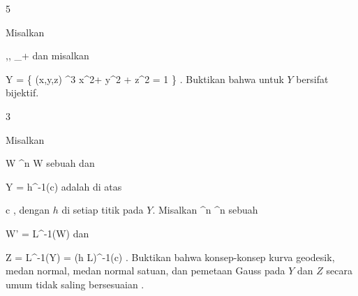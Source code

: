{5}
{

Misalkan

\mavergleichskette
{\vergleichskette
{ \alpha,\beta, \gamma
}
{ \in }{ \R_+
}
{  }{
}
{    }{
}
{   }{
}
}
{}{}{}
dan misalkan

\mavergleichskettedisp
{\vergleichskette
{ Y
}
{ =} { \left\{ (x,y,z) \in \R^3  \mid   \alpha x^2+ \beta y^2 + \gamma z^2 = 1        \right\}
}
{ } {
}
{ } {
}
{ } {
}
}
{}{}{.}
Buktikan bahwa
untuk $Y$ bersifat bijektif.

}
{} {}

{3}
{

Misalkan

\mavergleichskette
{\vergleichskette
{ W
}
{ \subseteq }{ \R^n
}
{  }{
}
{    }{
}
{   }{
}
}
{}{}{}
 { W } { \R
} {}
sebuah
dan

\mavergleichskette
{\vergleichskette
{ Y
}
{ = }{ h^{-1}(c)
}
{  }{
}
{    }{
}
{   }{
}
}
{}{}{}
adalah
di atas

\mavergleichskette
{\vergleichskette
{ c
}
{ \in }{ \R
}
{  }{
}
{    }{
}
{   }{
}
}
{}{}{,}
dengan $h$
di setiap titik pada $Y$. Misalkan
 {\R^n } { \R^n
} {}
sebuah

\mavergleichskette
{\vergleichskette
{ W'
}
{ = }{ L^{-1}(W)
}
{  }{
}
{    }{
}
{   }{
}
}
{}{}{}
dan

\mavergleichskettedisp
{\vergleichskette
{ Z
}
{ =} { L^{-1}(Y)
}
{ =} { (h \circ L)^{-1}(c)
}
{ } {
}
{ } {
}
}
{}{}{.}
Buktikan bahwa konsep-konsep kurva geodesik, medan normal, medan normal satuan, dan pemetaan Gauss pada $Y$ dan $Z$ secara umum tidak saling bersesuaian
 {} {.}

}
{} {}
